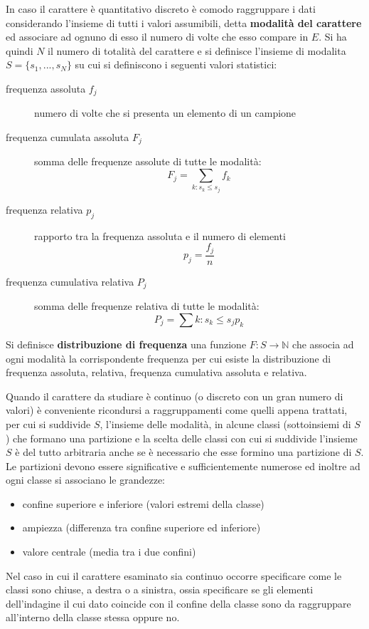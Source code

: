 \documentclass[a4paper,12pt, oneside]{book}
\newcommand{\numberset}{\mathbb}
\newcommand{\N}{\numberset{N}}
\begin{document}
In caso il carattere è quantitativo discreto è comodo raggruppare i dati considerando 
l'insieme di tutti i valori assumibili, detta \textbf{modalità del carattere} ed associare ad ognuno 
di esso il numero di volte che esso compare in $E$.\newline
Si ha quindi $N$ il numero di totalità del carattere e si definisce l'insieme di modalita
$S=\{s_1,...,s_N\}$ su cui si definiscono i seguenti valori statistici:
\begin{description}
    \item [frequenza assoluta $f_j$] numero di volte che si presenta un elemento di un campione
    \item [frequenza cumulata assoluta $F_j$] somma delle frequenze assolute di tutte le modalità:
            \[ F_j = \sum_{k:s_k \leq s_j} f_k \]
    \item [frequenza relativa $p_j$] rapporto tra la frequenza assoluta e il numero di elementi 
            \[ p_j = \frac{f_j}{n} \]
    \item [frequenza cumulativa relativa $P_j$] somma delle frequenze relativa di tutte le modalità:
            \[ P_j = \sum{k:s_k \leq s_j} p_k \]
\end{description}
Si definisce \textbf{distribuzione di frequenza} una funzione $F:S \to \N$ che associa ad ogni modalità la corrispondente frequenza
per cui esiste la distribuzione di frequenza assoluta, relativa, frequenza cumulativa assoluta e relativa.

Quando il carattere da studiare è continuo (o discreto con un gran numero di valori) è conveniente 
ricondursi a raggruppamenti come quelli appena trattati, per cui si suddivide $S$, l'insieme delle modalità,
in alcune classi (sottoinsiemi di $S$) che formano una partizione e la scelta delle classi con cui 
si suddivide l'insieme $S$ è del tutto arbitraria anche se è necessario che esse formino una partizione di $S$.\newline
Le partizioni devono essere significative e sufficientemente numerose ed inoltre ad ogni classe si associano le grandezze:
\begin{itemize}
\item confine superiore e inferiore (valori estremi della classe)
\item ampiezza (differenza tra confine superiore ed inferiore)
\item valore centrale (media tra i due confini)
\end{itemize}
Nel caso in cui il carattere esaminato sia continuo occorre specificare come le classi sono chiuse, a destra o a sinistra,
ossia specificare se gli elementi dell'indagine il cui dato coincide con il confine della classe sono da raggruppare
all'interno della classe stessa oppure no.
\end{document}
